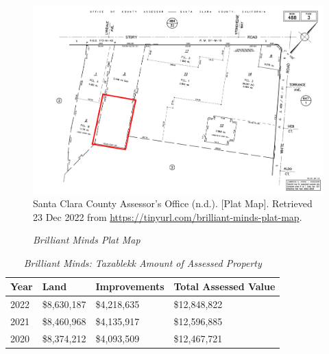 \begin{figure}[t]
  \centering
  \caption[Brilliant Minds Plat Map]{\textit{Brilliant Minds Plat Map}}\label{fig:brilliant-minds-plat-map}
  \includegraphics[width=\textwidth]{Assessor-Info/brilliant-minds-plat-map-488-03}\\ %
  \footnotesize{Santa Clara County Assessor's Office (n.d.). [Plat Map]. Retrieved 23 Dec 2022 from  \url{https://tinyurl.com/brilliant-minds-plat-map}}.
\end{figure}

\begin{table}[hbt]
\SingleSpacing%
  \caption[Brilliant Minds: Taxable Amount of Assessed Propery]{\textit{Brilliant Minds: Taxablekk Amount of Assessed Property}}\label{tab:brilliant-minds-taxable-amount}
  \begin{tabular}{llll}
    \toprule
   Year  & Land        & Improvements & Total Assessed Value \\
    \midrule
    2022 & \$8,630,187 & \$4,218,635  & \$12,848,822 \\
    2021 & \$8,460,968 & \$4,135,917  & \$12,596,885 \\
    2020 & \$8,374,212 & \$4,093,509  & \$12,467,721 \\
    \bottomrule
  \end{tabular}
\end{table}

